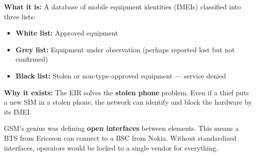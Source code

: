
\textbf{What it is:} A database of mobile equipment identities (IMEIs) classified into three lists:

\begin{itemize}
\tightlist
\item
  \textbf{White list:} Approved equipment
\item
  \textbf{Grey list:} Equipment under observation (perhaps reported lost but not confirmed)
\item
  \textbf{Black list:} Stolen or non-type-approved equipment — service denied
\end{itemize}

\textbf{Why it exists:} The EIR solves the \textbf{stolen phone} problem. Even if a thief puts a new SIM in a stolen phone, the network can identify and block the hardware by its IMEI.



\CNchained{}

GSM’s genius was defining \textbf{open interfaces} between elements. This means a BTS from Ericsson can connect to a BSC from Nokia. Without standardized interfaces, operators would be locked to a single vendor for everything.



